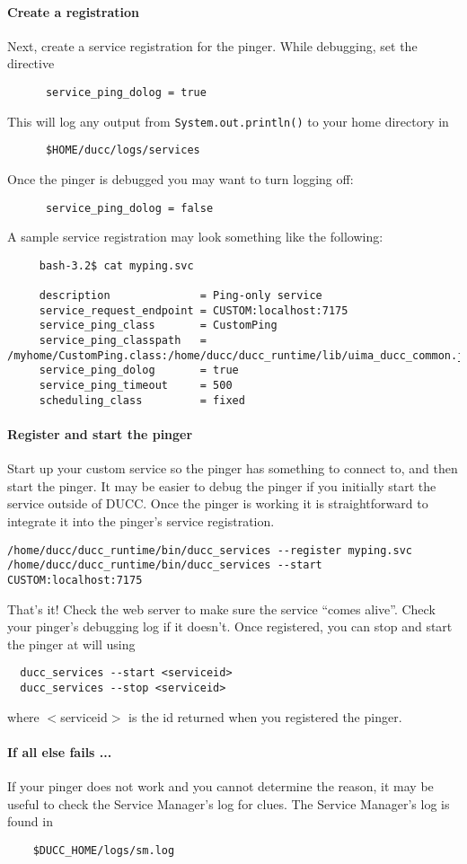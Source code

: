       \paragraph{Create a registration}Next, create a service registration for the pinger.  While
      debugging, set the directive
\begin{verbatim}
      service_ping_dolog = true
\end{verbatim}
      This will log any output from  {\tt System.out.println()} to your home directory in
\begin{verbatim}
      $HOME/ducc/logs/services
\end{verbatim}

      Once the pinger is debugged you may want to turn logging off:
\begin{verbatim}
      service_ping_dolog = false
\end{verbatim}
      
      A sample service registration may look something like the following:
\begin{verbatim}
     bash-3.2$ cat myping.svc

     description              = Ping-only service
     service_request_endpoint = CUSTOM:localhost:7175
     service_ping_class       = CustomPing
     service_ping_classpath   = /myhome/CustomPing.class:/home/ducc/ducc_runtime/lib/uima_ducc_common.jar
     service_ping_dolog       = true
     service_ping_timeout     = 500
     scheduling_class         = fixed
\end{verbatim}
       
      \paragraph{Register and start the pinger} Start up your custom service so the pinger has something to connect to, and then start
      the pinger.  It may be easier to debug the pinger if you initially start the service outside of DUCC. Once
      the pinger is working it is straightforward to integrate it into the pinger's service registration.
\begin{verbatim}
/home/ducc/ducc_runtime/bin/ducc_services --register myping.svc
/home/ducc/ducc_runtime/bin/ducc_services --start CUSTOM:localhost:7175
\end{verbatim}

      That's it!  Check the web server to make sure the service ``comes alive''.  Check your pinger's
      debugging log if it doesn't.  Once registered, you can stop and start the pinger at will using
\begin{verbatim}
  ducc_services --start <serviceid>
  ducc_services --stop <serviceid>
\end{verbatim}
     where $<$serviceid$>$ is the id returned when you registered the pinger.

     \paragraph{If all else fails ...}
     If your pinger does not work and you cannot determine the reason, it may be useful to check
     the Service Manager's log for clues.  The Service Manager's log is found in
\begin{verbatim}
    $DUCC_HOME/logs/sm.log
\end{verbatim}
     
